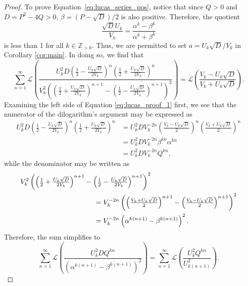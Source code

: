 \documentclass[10pt]{article}
\theoremstyle{definition}
\begin{document}
\begin{proof}
To prove Equation~\eqref{eq:lucas_series_pos}, notice that since $Q > 0$ and $D = P^2 - 4Q > 0$, $\beta = (P-\sqrt{D})/2$ is also positive. 
 Therefore, the quotient
\begin{equation*}
    \frac{\sqrt{D} U_k}{V_k} = \frac{\alpha^k - \beta^k}{\alpha^k + \beta^k}
\end{equation*}
    is less than 1 for all $k \in \mathbb{Z}_{> 0}$.  Thus, we are permitted to set $a = U_k\sqrt{D}/V_k$ in Corollary \ref{cor:main}.  In doing so, we find that
    \begin{equation}
        \sum_{n=1}^{\infty}\mathcal{L}\left(\frac{U^2_k D\left(\frac{1}{2}-\frac{U_k\sqrt{D}}{2V_k}\right)^{n}\left(\frac{1}{2} + \frac{U_k\sqrt{D}}{2 V_k}\right)^{n}}{V^2_k\left(\left(\frac{1}{2}+\frac{U_k\sqrt{D}}{2 V_k}\right)^{n+1}-\left(\frac{1}{2} - \frac{U_k \sqrt{D}}{2 V_k}\right)^{n+1}\right)^2}\right) = \mathcal{L}\left(\frac{V_k-U_k \sqrt{D}}{V_k+U_k\sqrt{D}}\right).\label{eq:lucas_proof_1}
    \end{equation}
    Examining the left side of Equation \eqref{eq:lucas_proof_1} first, we see that the numerator of the dilogarithm's argument may be expressed as
    \begin{align*}
        U^2_k D\left(\tfrac{1}{2}-\tfrac{U_k\sqrt{D}}{2V_k}\right)^{n}\left(\tfrac{1}{2} + \tfrac{U_k\sqrt{D}}{2 V_k}\right)^{n} &= U^2_k D V^{-2n}_k\left(\tfrac{V_k-U_k\sqrt{D}}{2}\right)^{n}\left(\tfrac{V_k+U_k\sqrt{D}}{2}\right)^{n} \\
        &= U^2_k D V^{-2n}_k \beta^{kn} \alpha^{kn} \\
        &= U^2_k D V^{-2n}_k Q^{kn},
    \end{align*}
    while the denominator may be written as
    \begin{align*}
        \MoveEqLeft[12]  V^2_k\left(\left(\tfrac{1}{2}+\tfrac{U_k\sqrt{D}}{2 V_k}\right)^{n+1} -\left(\tfrac{1}{2} - \tfrac{U_k \sqrt{D}}{2  V_k}\right)^{n+1}\right)^2 \\ 
        ={}& V^{-2n}_k\left(\left(\tfrac{V_k + U_k\sqrt{D}}{2}\right)^{n+1}-\left(\tfrac{V_k - U_k \sqrt{D}}{2}\right)^{n+1}\right)^2 \\
        ={}& V^{-2n}_k \left(\alpha^{k(n+1)} - \beta^{k(n+1)}\right)^2.
    \end{align*}
    Therefore, the sum simplifies to
    \begin{equation*}
        \sum_{n=1}^{\infty}\mathcal{L}\left(\frac{U^2_k D Q^{kn}}{(\alpha^{k(n+1)} - \beta^{k(n+1)})^2}\right) =  \sum_{n=1}^{\infty}\mathcal{L}\left(\frac{U^2_k Q^{kn}}{U^2_{k(n+1)}}\right).
    \end{equation*}
    

\end{proof}
\end{document}
